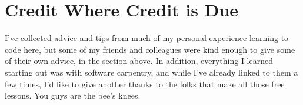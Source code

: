 \documentclass[letterpaper]{article}
\begin{document}
\section{Credit Where Credit is Due}

I've collected advice and tips from much of my personal experience learning to code here, but some of my friends and colleagues were kind enough to give some of their own advice, in the section above.  In addition, everything I learned starting out was with software carpentry, and while I've already linked to them a few times, I'd like to give another thanks to the folks that make all those free lessons.  You guys are the bee's knees.
\end{document}
